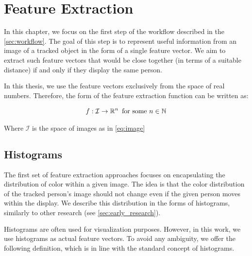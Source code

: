 \chapter{Feature Extraction}


\label{ch:features}

In this chapter, we focus on the first step of the workflow described in the \autoref{sec:workflow}. The goal of this step is to represent useful information from an image of a tracked object in the form of a single feature vector. We aim to extract such feature vectors that would be close together (in terms of a suitable distance) if and only if they display the same person.

In this thesis, we use the feature vectors exclusively from the space of real numbers. Therefore, the form of the feature extraction function can be written as:

$$f : \mathcal{I} \rightarrow \mathbb{R}^n \, \text{ for some } n \in \mathbb{N}$$

Where $\mathcal{I}$ is the space of images as in \autoref{eq:image}

\section{Histograms}

\label{sec:histograms}

The first set of feature extraction approaches focuses on encapsulating the distribution of color within a given image. The idea is that the color distribution of the tracked person's image should not change even if the given person moves within the display. We describe this distribution in the forms of histograms, similarly to other research (see \autoref{sec:early_research}).


Histograms are often used for visualization purposes. However, in this work, we use histograms as actual feature vectors. To avoid any ambiguity, we offer the following definition, which is in line with the standard concept of histograms.%

